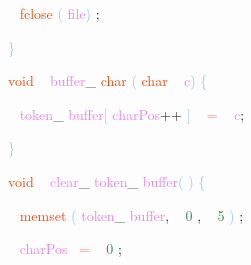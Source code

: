 \documentclass[8, usernames, dvipsnames]{beamer}
\begin{document}
\begin{frame}
\textcolor{White}{\   }
\textcolor{OrangeRed}{fclose}
\textcolor{SkyBlue}{(}
\textcolor{Violet}{file}\textcolor{SkyBlue}{)}
\textcolor{Sepia}{;}

 \textcolor{SkyBlue}{\} }

 
 \textcolor{OrangeRed}{void}
\textcolor{White}{\ }
\textcolor{Violet}{buffer}\textcolor{Sepia}{\_}
\textcolor{OrangeRed}{char}
\textcolor{SkyBlue}{(}
\textcolor{OrangeRed}{char}
\textcolor{White}{\ }
\textcolor{Violet}{c}\textcolor{SkyBlue}{)}
\textcolor{SkyBlue}{\{ }

 \textcolor{White}{\   }
\textcolor{Violet}{token}\textcolor{Sepia}{\_}
\textcolor{Violet}{buffer}\textcolor{SkyBlue}{[}
\textcolor{Violet}{charPos}\textcolor{Apricot}{++}
\textcolor{SkyBlue}{]}
\textcolor{White}{\ }
\textcolor{Salmon}{=}
\textcolor{White}{\ }
\textcolor{Violet}{c}\textcolor{Sepia}{;}

 \textcolor{SkyBlue}{\} }

 
 \textcolor{OrangeRed}{void}
\textcolor{White}{\ }
\textcolor{Violet}{clear}\textcolor{Sepia}{\_}
\textcolor{Violet}{token}\textcolor{Sepia}{\_}
\textcolor{Violet}{buffer}\textcolor{SkyBlue}{(}
\textcolor{SkyBlue}{)}
\textcolor{SkyBlue}{\{ }

 \textcolor{White}{\   }
\textcolor{OrangeRed}{memset}
\textcolor{SkyBlue}{(}
\textcolor{Violet}{token}\textcolor{Sepia}{\_}
\textcolor{Violet}{buffer}\textcolor{Sepia}{,}
\textcolor{White}{\ }
\textcolor{SeaGreen}{0}
\textcolor{Sepia}{,}
\textcolor{White}{\ }
\textcolor{SeaGreen}{5}
\textcolor{SkyBlue}{)}
\textcolor{Sepia}{;}

 \textcolor{White}{\   }
\textcolor{Violet}{charPos}\textcolor{White}{\ }
\textcolor{Salmon}{=}
\textcolor{White}{\ }
\textcolor{SeaGreen}{0}
\textcolor{Sepia}{;}

 \end{frame}
\end{document}
